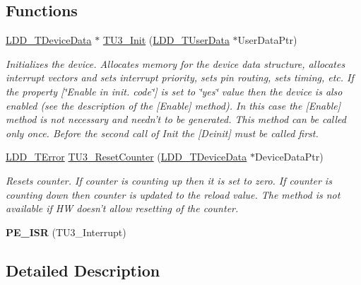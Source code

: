 \subsection*{Functions}
\begin{DoxyCompactItemize}
\item 
\hyperlink{group___p_e___types__module_gac5cf1362f1f0e3a2ce71b1bf2276d091}{L\-D\-D\-\_\-\-T\-Device\-Data} $\ast$ \hyperlink{group___t_u3__module_gaf601d718c3698e63d9e6fc075aa9222d}{T\-U3\-\_\-\-Init} (\hyperlink{group___p_e___types__module_ga0b66a73f87238a782318aa0be7578e35}{L\-D\-D\-\_\-\-T\-User\-Data} $\ast$User\-Data\-Ptr)
\begin{DoxyCompactList}\small\item\em Initializes the device. Allocates memory for the device data structure, allocates interrupt vectors and sets interrupt priority, sets pin routing, sets timing, etc. If the property \mbox{[}\char`\"{}\-Enable in init. code\char`\"{}\mbox{]} is set to \char`\"{}yes\char`\"{} value then the device is also enabled (see the description of the \mbox{[}Enable\mbox{]} method). In this case the \mbox{[}Enable\mbox{]} method is not necessary and needn't to be generated. This method can be called only once. Before the second call of Init the \mbox{[}Deinit\mbox{]} must be called first. \end{DoxyCompactList}\item 
\hyperlink{group___p_e___types__module_ga24c2b045fd04e79e85f261ce4df35588}{L\-D\-D\-\_\-\-T\-Error} \hyperlink{group___t_u3__module_gad9df81d82c4a6110f91af5db4834c95f}{T\-U3\-\_\-\-Reset\-Counter} (\hyperlink{group___p_e___types__module_gac5cf1362f1f0e3a2ce71b1bf2276d091}{L\-D\-D\-\_\-\-T\-Device\-Data} $\ast$Device\-Data\-Ptr)
\begin{DoxyCompactList}\small\item\em Resets counter. If counter is counting up then it is set to zero. If counter is counting down then counter is updated to the reload value. The method is not available if H\-W doesn't allow resetting of the counter. \end{DoxyCompactList}\item 
\hypertarget{group___t_u3__module_ga7c756b7afc847d133e01471957921c2e}{{\bfseries P\-E\-\_\-\-I\-S\-R} (T\-U3\-\_\-\-Interrupt)}\label{group___t_u3__module_ga7c756b7afc847d133e01471957921c2e}

\end{DoxyCompactItemize}


\subsection{Detailed Description}


